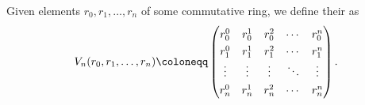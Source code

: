 \begin{example}\label{ex:vandermonde_matrix}
  Given elements \( r_0, r_1, \ldots, r_n \) of some commutative ring, we define their  as
  \begin{equation*}
    \RenewDocumentCommand \arraystretch {} {1.3}
    V_n(r_0, r_1, \ldots, r_n)
    \coloneqq
    \begin{pmatrix}
      r_0^0  & r_0^1  & r_0^2  & \cdots & r_0^n  \\
      r_1^0  & r_1^1  & r_1^2  & \cdots & r_1^n  \\
      \vdots & \vdots & \vdots & \ddots & \vdots \\
      r_n^0  & r_n^1  & r_n^2  & \cdots & r_n^n
    \end{pmatrix}.
  \end{equation*}


\end{example}

